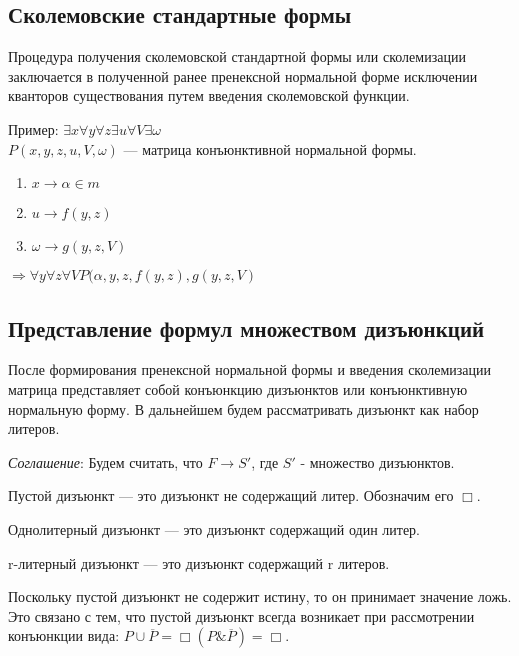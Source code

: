\documentclass[a4paper,12pt]{report}
\begin{document}
\subsection{Сколемовские стандартные формы}

	Процедура получения сколемовской стандартной формы или сколемизации
	заключается в полученной ранее пренексной нормальной форме исключении
	кванторов существования путем введения сколемовской функции.\par
	Пример: $\exists x \forall y \forall z \exists u \forall V \exists \omega$\\
	$P(x,y,z,u,V,\omega)$ --- матрица конъюнктивной нормальной формы.\par

	\begin{enumerate}
		\item $x \to \alpha \in m$
		\item $u \to f(y,z)$
		\item $\omega \to g(y,z,V)$
	\end{enumerate}
	$\Rightarrow \forall y \forall z \forall V P(\alpha,y,z,f(y,z),g(y,z,V)$


\subsection{Представление формул множеством дизъюнкций}

	После формирования пренексной нормальной формы и введения сколемизации
	матрица представляет собой конъюнкцию дизъюнктов или конъюнктивную нормальную
	форму. В дальнейшем будем рассматривать дизъюнкт как набор литеров.\\ \par
	\textit{Соглашение}: Будем считать, что $F \to S'$, где $S'$ - множество
	дизъюнктов.\\ \par

	Пустой дизъюнкт --- это дизъюнкт не содержащий литер. Обозначим его
	$\Box$.\par
	Однолитерный дизъюнкт --- это дизъюнкт содержащий один литер.\par
	r-литерный дизъюнкт --- это дизъюнкт содержащий r литеров.\\ \par

	Поскольку пустой дизъюнкт не содержит истину, то он принимает значение ложь.
	Это связано с тем, что пустой дизъюнкт всегда возникает при рассмотрении
	конъюнкции вида: $P \cup \overline{P} = \Box(P \& \overline{P}) = \Box$.
	\\ \par
\end{document}
